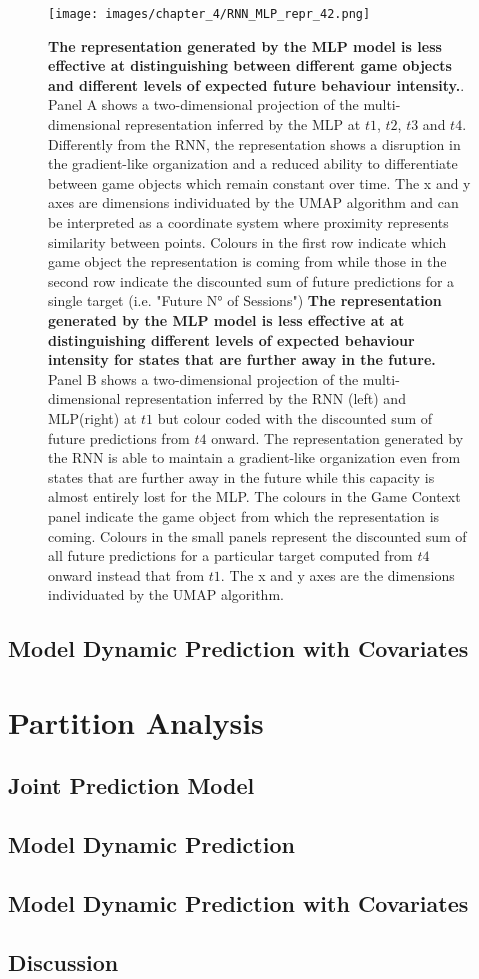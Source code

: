 \begin{figure}[ht]
\centering
\texttt{[image: images/chapter\_4/RNN\_MLP\_repr\_42.png]}
\caption{\textbf{The representation generated by the MLP model is less effective at distinguishing between different game objects and different levels of expected future behaviour intensity.}. Panel A shows a two-dimensional projection of the multi-dimensional representation inferred by the MLP at $t1$, $t2$, $t3$ and $t4$. Differently from the RNN, the representation shows a disruption in the gradient-like organization and a reduced ability to differentiate between game objects which remain constant over time. The x and y axes are dimensions individuated by the UMAP algorithm and can be interpreted as a coordinate system where proximity represents similarity between points. Colours in the first row indicate which game object the representation is coming from while those in the second row indicate the discounted sum of future predictions for a single target (i.e. "Future N° of Sessions") \textbf{The representation generated by the MLP model is less effective at at distinguishing different levels of expected behaviour intensity for states that are further away in the future.} Panel B shows a two-dimensional projection of the multi-dimensional representation inferred by the RNN (left) and MLP(right) at $t1$ but colour coded with the discounted sum of future predictions from $t4$ onward. The representation generated by the RNN is able to maintain a gradient-like organization even from states that are further away in the future while this capacity is almost entirely lost for the MLP. The colours in the Game Context panel indicate the game object from which the representation is coming. Colours in the small panels represent the discounted sum of all future predictions for a particular target computed from $t4$ onward instead that from $t1$. The x and y axes are the dimensions individuated by the UMAP algorithm.}
\label{predictive_panel}
\end{figure}

\subsection{Model Dynamic Prediction with Covariates}
\lorem

\section{Partition Analysis}
\lorem

\subsection{Joint Prediction Model}
\lorem

\subsection{Model Dynamic Prediction}
\lorem

\subsection{Model Dynamic Prediction with Covariates}
\lorem

\subsection{Discussion}
\lorem
